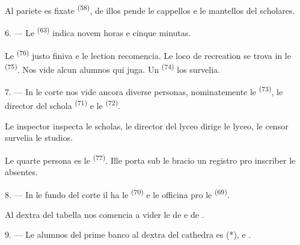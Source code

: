 Al pariete es fixate  \textsuperscript{(58)}, de
illos pende le cappellos e le mantellos del scholares.

\VUsaut{5.2mm}
\VUsaut{3.6mm}

6. --- Le  \textsuperscript{(63)} indica novem horas e cinque
minutas.

Le  \textsuperscript{(76)} justo finiva e le lection
recomencia. Le loco de recreation se trova in le 
\textsuperscript{(75)}. Nos vide alcun alumnos qui juga. Un 
\textsuperscript{(74)} los survelia.

7. --- In le corte nos vide ancora diverse personas, nominatemente le
 \textsuperscript{(73)}, le director del schola
 \textsuperscript{(71)} e le 
\textsuperscript{(72)}.

Le inspector inspecta le scholas, le director del lyceo dirige le lyceo, le
censor survelia le studios.

Le quarte persona es le  \textsuperscript{(77)}. Ille porta sub
le bracio un registro pro inscriber le absentes.

8. --- In le fundo del corte il ha le 
\textsuperscript{(70)} e le officina pro le 
\textsuperscript{(69)}.

Al dextra del tabella nos comencia a vider le  de
 e de .


\VUsaut{2.4mm}

\VUsaut{3.0mm}

9. --- Le alumnos del prime banco al dextra del cathedra es 
(*),  e .

